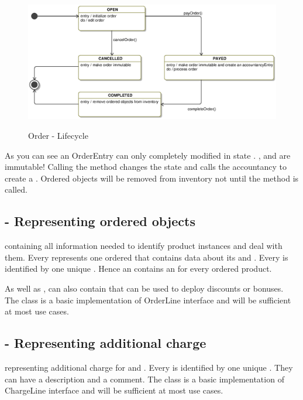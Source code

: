 \begin{figure}[ht]
	\centering
  \includegraphics[width=1.0\textwidth]{images/Order_StateMachine.eps}
	\label{order_statemachine}
	\caption{Order - Lifecycle}
\end{figure}  

As you can see an OrderEntry can only completely modified in state . ,  and   are immutable!  Calling the  method changes the state and calls the accountancy to create a . Ordered objects will be removed from inventory not until the  method is called.  

\subsection{ - Representing ordered objects}
 containing all information needed to identify product instances and deal with them. Every  represents one ordered  that contains data about its  and . Every  is identified by one unique . Hence an  contains an  for every ordered product. 

As well as ,  can also contain  that can be used to deploy discounts or bonuses. The  class is a basic implementation of OrderLine interface and will be sufficient at most use cases.

\subsection{ - Representing additional charge}
 representing additional charge for  and . Every  is identified by one unique . They can have a description and a comment. The  class is a basic implementation of ChargeLine interface and will be sufficient at most use cases.


